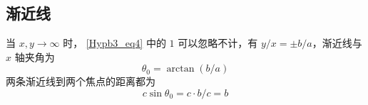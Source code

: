 \subsection{渐近线}
当 $x,y\to \infty$ 时， \autoref{Hypb3_eq4} 中的 $1$ 可以忽略不计，有 $y/x = \pm b/a$，渐近线与 $x$ 轴夹角为
\begin{equation}
\theta_0 = \arctan(b/a)
\end{equation}
两条渐近线到两个焦点的距离都为
\begin{equation}
c\sin\theta_0 = c\cdot b/c = b
\end{equation}











